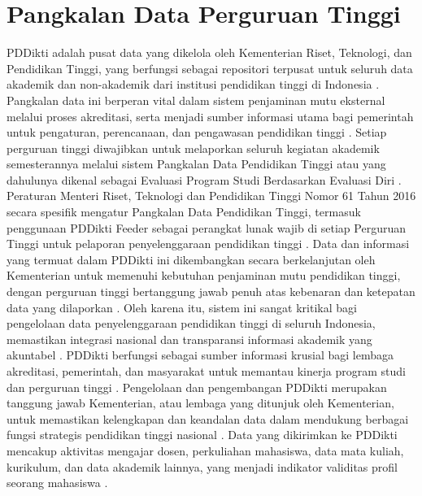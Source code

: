 \documentclass[12pt,a4paper,oneside]{report}
\begin{document}
        \section{Pangkalan Data Perguruan Tinggi}
        PDDikti adalah pusat data yang dikelola oleh Kementerian Riset, Teknologi, dan Pendidikan Tinggi, yang berfungsi sebagai repositori terpusat untuk seluruh data akademik dan non-akademik dari institusi pendidikan tinggi di Indonesia  \parencite{ngatmari_ngatmari_87a9f833}.
        Pangkalan data ini berperan vital dalam sistem penjaminan mutu eksternal melalui proses akreditasi, serta menjadi sumber informasi utama bagi pemerintah untuk pengaturan, perencanaan, dan pengawasan pendidikan tinggi  \parencite{menteri_pendidikan_fd83efd6}  \parencite{undang_undang_republik_indonesia_nomor_12_tahun_2012_tentang_pendidikan_tinggi_5e8158d0}.
        Setiap perguruan tinggi diwajibkan untuk melaporkan seluruh kegiatan akademik semesterannya melalui sistem Pangkalan Data Pendidikan Tinggi atau yang dahulunya dikenal sebagai Evaluasi Program Studi Berdasarkan Evaluasi Diri  \parencite{widarta_widarta_0071f08c}.
        Peraturan Menteri Riset, Teknologi dan Pendidikan Tinggi Nomor 61 Tahun 2016 secara spesifik mengatur Pangkalan Data Pendidikan Tinggi, termasuk penggunaan PDDikti Feeder sebagai perangkat lunak wajib di setiap Perguruan Tinggi untuk pelaporan penyelenggaraan pendidikan tinggi  \parencite{muhadi_hariyanto_3071c01e}.
        Data dan informasi yang termuat dalam PDDikti ini dikembangkan secara berkelanjutan oleh Kementerian untuk memenuhi kebutuhan penjaminan mutu pendidikan tinggi, dengan perguruan tinggi bertanggung jawab penuh atas kebenaran dan ketepatan data yang dilaporkan  \parencite{peraturan_menteri_pendidikan_tinggi__sains__dan_teknologi_tentang_penjaminan_mutu_pendidikan_tinggi_4712741f}.
        Oleh karena itu, sistem ini sangat kritikal bagi pengelolaan data penyelenggaraan pendidikan tinggi di seluruh Indonesia, memastikan integrasi nasional dan transparansi informasi akademik yang akuntabel  \parencite{widarta_widarta_0071f08c}  \parencite{peraturan_menteri_pendidikan_tinggi__sains__dan_teknologi_tentang_penjaminan_mutu_pendidikan_tinggi_4712741f}.
        PDDikti berfungsi sebagai sumber informasi krusial bagi lembaga akreditasi, pemerintah, dan masyarakat untuk memantau kinerja program studi dan perguruan tinggi  \parencite{undang_undang_republik_indonesia_nomor_12_tahun_2012_tentang_pendidikan_tinggi_5e8158d0}.
        Pengelolaan dan pengembangan PDDikti merupakan tanggung jawab Kementerian, atau lembaga yang ditunjuk oleh Kementerian, untuk memastikan kelengkapan dan keandalan data dalam mendukung berbagai fungsi strategis pendidikan tinggi nasional  \parencite{undang_undang_republik_indonesia_nomor_12_tahun_2012_tentang_pendidikan_tinggi_5e8158d0}  \parencite{peraturan_menteri_pendidikan_tinggi__sains__dan_teknologi_tentang_penjaminan_mutu_pendidikan_tinggi_4712741f}.
        Data yang dikirimkan ke PDDikti mencakup aktivitas mengajar dosen, perkuliahan mahasiswa, data mata kuliah, kurikulum, dan data akademik lainnya, yang menjadi indikator validitas profil seorang mahasiswa  \parencite{adi_wirawan_ef077ca7}. 
\end{document}
